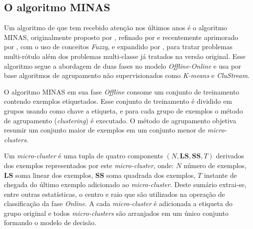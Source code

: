 \subsection{O algoritmo MINAS}\label{sec:minas-og}

Um algoritmo de \nd que tem recebido atenção nos últimos anos é o algoritmo
MINAS, originalmente proposto por , refinado por
 e recentemente aprimorado por
, com o uso de conceitos \emph{Fuzzy}, e expandido por
, para tratar problemas multi-rótulo além dos problemas
multi-classe já tratados na versão original.
Esse algoritmo segue a abordagem de duas fases no modelo \emph{Offline-Online} e
usa por base algoritmos de agrupamento não supervisionados como \emph{K-means} e
\emph{CluStream}.


\newcommand{\mcluster}{\emph{micro-cluster}\xspace}
\newcommand{\mclusters}{\emph{micro-clusters}\xspace}


O algoritmo MINAS em sua fase \emph{Offline} consome um conjunto de treinamento
contendo exemplos etiquetados.
Esse conjunto de treinamento é dividido em grupos usando como chave a etiqueta,
e para cada grupo de exemplos o método de agrupamento (\emph{clustering}) é executado.
O método de agrupamento objetiva resumir um conjunto maior de exemplos em
um conjunto menor de \mclusters.

Um \mcluster é uma tupla de quatro components $(N, \mathbf{LS}, \mathbf{SS}, T)$
derivados dos exemplos representados por este \mcluster, onde:
$N$ número de exemplos,
$\mathbf{LS}$ soma linear dos exemplos,
$\mathbf{SS}$ soma quadrada dos exemplos,
$T$ instante de chegada do último exemplo adicionado ao \mcluster.
Deste sumário extrai-se, entre outras estatísticas, o centro e raio que são
utilizados na operação de classificação da fase \emph{Online}.
A cada \mcluster é adicionada a etiqueta do grupo original e todos \mclusters
são arranjados em um único conjunto formando o modelo de decisão.

